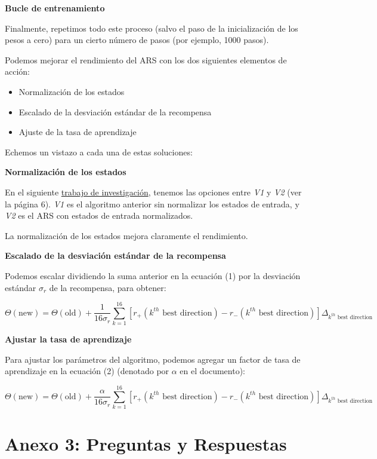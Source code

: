 \documentclass[]{book}
\providecommand{\tightlist}{%
  \setlength{\itemsep}{0pt}\setlength{\parskip}{0pt}}
\begin{document}
\textbf{Bucle de entrenamiento}

Finalmente, repetimos todo este proceso (salvo el paso de la inicialización de los pesos a cero) para un cierto número de pasos (por ejemplo, 1000 pasos).

Podemos mejorar el rendimiento del ARS con los dos siguientes elementos de acción:

\begin{itemize}
\tightlist
\item
  Normalización de los estados
\item
  Escalado de la desviación estándar de la recompensa
\item
  Ajuste de la tasa de aprendizaje
\end{itemize}

Echemos un vistazo a cada una de estas soluciones:

\textbf{Normalización de los estados}

En el siguiente \href{https://arxiv.org/pdf/1803.07055.pdf}{trabajo de investigación}, tenemos las opciones entre \emph{V1} y \emph{V2} (ver la página 6). \emph{V1} es el algoritmo anterior sin normalizar los estados de entrada, y \emph{V2} es el ARS con estados de entrada normalizados.

La normalización de los estados mejora claramente el rendimiento.

\textbf{Escalado de la desviación estándar de la recompensa}

Podemos escalar dividiendo la suma anterior en la ecuación (1) por la desviación estándar \(\sigma_r\) de la recompensa, para obtener:

\[
\Theta(\textrm{new}) = \Theta(\textrm{old}) + \frac{1}{16 \sigma_r} \sum_{k=1}^{16} [r_{+}(\textrm{$k^{th}$ best direction}) - r_{-}(\textrm{$k^{th}$ best direction})] \Delta_{\textrm{$k^{th}$ best direction}}
\]

\textbf{Ajustar la tasa de aprendizaje}

Para ajustar los parámetros del algoritmo, podemos agregar un factor de tasa de aprendizaje en la ecuación (2) (denotado por \(\alpha\) en el documento):

\[
\Theta(\textrm{new}) = \Theta(\textrm{old}) + \frac{\alpha}{16 \sigma_r} \sum_{k=1}^{16} [r_{+}(\textrm{$k^{th}$ best direction}) - r_{-}(\textrm{$k^{th}$ best direction})] \Delta_{\textrm{$k^{th}$ best direction}}
\]

\hypertarget{anexo-3-preguntas-y-respuestas}{%
\section{Anexo 3: Preguntas y Respuestas}\label{anexo-3-preguntas-y-respuestas}}
\end{document}
